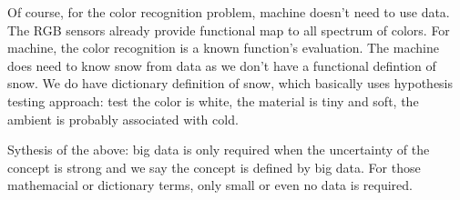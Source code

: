 \documentclass{article}
\numberwithin{equation}{subsection}
\begin{document}
	Of course, for the color recognition problem, machine doesn't need to use data. The RGB sensors already provide functional map to all spectrum of colors. For machine, the color recognition is a known function's evaluation. The machine does need to know snow from data as we don't have a functional defintion of snow. We do have dictionary definition of snow, which basically uses hypothesis testing approach: test the color is white, the material is tiny and soft, the ambient is probably associated with cold.
	
	Sythesis of the above: big data is only required when the uncertainty of the concept is strong and we say the concept is defined by big data. For those mathemacial or dictionary terms, only small or even no data is required.
\end{document}
